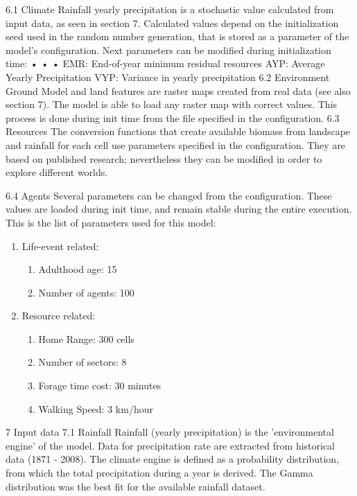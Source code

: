 6.1 Climate
Rainfall yearly precipitation is a stochastic value calculated from input data, as seen in section 7.
Calculated values depend on the initialization seed used in the random number generation, that is
stored as a parameter of the model's configuration. Next parameters can be modified during
initialization time:
•
•
•
EMR: End-of-year minimum residual resources
AYP: Average Yearly Precipitation
VYP: Variance in yearly precipitation
6.2 Environment
Ground Model and land features are raster maps created from real data (see also section 7). The
model is able to load any raster map with correct values. This process is done during init time from the
file specified in the configuration.
6.3 Resources
The conversion functions that create available biomass from landscape and rainfall for each cell use
parameters specified in the configuration. They are based on published research; nevertheless they
can be modified in order to explore different worlds.

6.4 Agents
Several parameters can be changed from the configuration. These values are loaded during init time,
and remain stable during the entire execution. This is the list of parameters used for this model:

\begin{enumerate}
	\item Life-event related:
	\begin{enumerate}
		\item Adulthood age: 15
		\item Number of agents: 100
	\end{enumerate}
	\item Resource related:
	\begin{enumerate}
		\item Home Range: 300 cells
		\item Number of sectors: 8
		\item Forage time cost: 30 minutes
		\item Walking Speed: 3 km/hour
	\end{enumerate}
\end{enumerate}

7
Input data
7.1 Rainfall
Rainfall (yearly precipitation) is the 'environmental engine' of the model. Data for precipitation rate are
extracted from historical data (1871 - 2008). The climate engine is defined as a probability distribution,
from which the total precipitation during a year is derived. The Gamma distribution was the best fit for
the available rainfall dataset.


